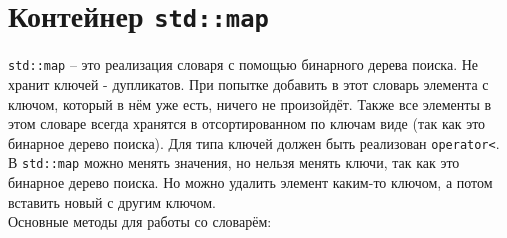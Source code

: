 \documentclass{article}
\begin{document}
\newpage


\newpage
\section*{Контейнер \texttt{std::map}}
\texttt{std::map} -- это реализация словаря с помощью бинарного дерева поиска. Не хранит ключей - дупликатов. При попытке добавить в этот словарь элемента с ключом, который в нём уже есть, ничего не произойдёт. Также все элементы в этом словаре всегда хранятся в отсортированном по ключам виде (так как это бинарное дерево поиска). Для типа ключей должен быть реализован \texttt{operator<}. В \texttt{std::map} можно менять значения, но нельзя менять ключи, так как это бинарное дерево поиска. Но можно удалить элемент каким-то ключом, а потом вставить новый с другим ключом.\\

Основные методы для работы со словарём:
\end{document}
